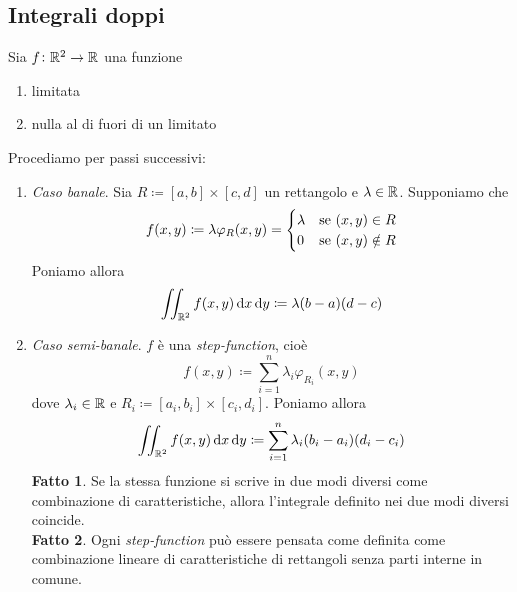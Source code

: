 
\subsection{Integrali doppi}

\begin{definition}
	Sia $ f \colon \mathbb{R}^2 \to \mathbb{R} $ una funzione
	\begin{enumerate}[label = (\roman*)]
		\item limitata
		\item nulla al di fuori di un limitato 
	\end{enumerate}
	Procediamo per passi successivi:
	\begin{enumerate}
		\item \emph{Caso banale}. Sia $ R \coloneqq [a, b] \times [c, d] $ un rettangolo e $ \lambda \in \mathbb{R} $. Supponiamo che 
		\begin{equation*}
			f(x, y) \coloneqq \lambda \varphi_{R}(x, y) = 
			\begin{cases}
				\lambda & \text{se $ (x, y) \in R $} \\
				0 & \text{se $ (x, y) \notin R $}
			\end{cases}
		\end{equation*}
		Poniamo allora 
		\begin{equation}
			\iint_{\R^2} f(x, y) \dif{x} \dif{y} \coloneqq \lambda (b - a) (d - c)
		\end{equation}
		
		\item \emph{Caso semi-banale}. $ f $ è una \emph{step-function}, cioè
		\begin{equation*}
			f(x, y) \coloneqq \sum_{i = 1}^{n} \lambda_i \varphi_{R_i}(x, y)
		\end{equation*}
		dove $ \lambda_i \in \mathbb{R} $ e $ R_i \coloneqq [a_i, b_i] \times [c_i, d_i] $. Poniamo allora 
		\begin{equation}
			\iint_{\R^2} f(x, y) \dif{x} \dif{y} \coloneqq \sum_{i = 1}^{n} \lambda_i (b_i - a_i) (d_i - c_i)
		\end{equation}
		\textbf{Fatto 1}. Se la stessa funzione si scrive in due modi diversi come combinazione di caratteristiche, allora l'integrale definito nei due modi diversi coincide. \\
		\textbf{Fatto 2}. Ogni \emph{step-function} può essere pensata come definita come combinazione lineare di caratteristiche di rettangoli senza parti interne in comune. 
		

\end{enumerate}
\end{definition}
